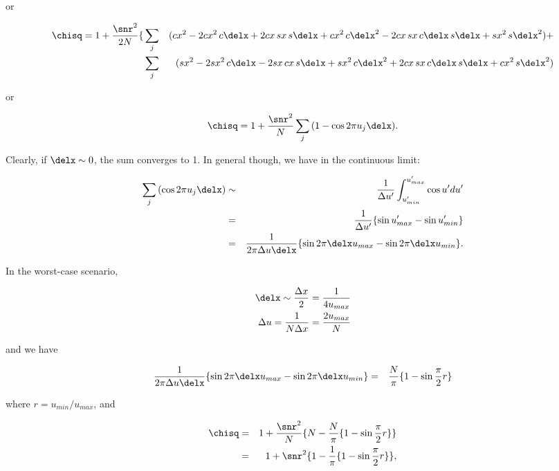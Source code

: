 or 

\begin{eqnarray}\nonumber
  \chisq = 1 + {\snr^2\over{2N}}\{&\sum_j&{( cx^2 - 2cx^2\,c\delx + 2cx\,sx\,s\delx + cx^2\,c\delx^2 - 2cx\,sx\,c\delx\,s\delx  + sx^2\,s\delx^2}) + \\\nonumber
                                  &\sum_j&{(sx^2 - 2sx^2\,c\delx - 2sx\,cx\,s\delx + sx^2\,c\delx^2 + 2cx\,sx\,c\delx\,s\delx + cx^2\,s\delx^2)}
\end{eqnarray}

or 

\begin{equation}
  \chisq = 1 + {\snr^2\over{N}}\sum_j{(1 - \cos{2\pi u_j\delx})}.
\end{equation}

Clearly, if $\delx\sim 0$, the sum converges to 1.  In general though, we have in the continuous limit:

\begin{eqnarray}\nonumber
  \sum_j{(\cos{2\pi u_j\delx})} &\sim& {1\over{\Delta u^\prime}}\int^{u^\prime_{max}}_{u^\prime_{min}}{\cos{u^\prime}du^\prime} \\\nonumber
  &=& {1\over{\Delta u^\prime}}\{\sin{u^\prime_{max}} - \sin{u^\prime_{min}}\} \\\nonumber
  &=& {1\over{2\pi\Delta u\delx}}\{\sin{2\pi\delx u_{max}} - \sin{2\pi\delx u_{min}}\}.
\end{eqnarray}

In the worst-case scenario, 

\begin{eqnarray}\nonumber
\delx \sim {{\Delta x}\over{2}} = {1\over{4u_{max}}}\\\nonumber
\Delta u = {1\over{N\Delta x}} = {{2u_{max}}\over{N}}
\end{eqnarray}

and we have

\begin{eqnarray}\nonumber
  {1\over{2\pi\Delta u\delx}}\{\sin{2\pi\delx u_{max}} - \sin{2\pi\delx u_{min}}\}
  &=&  {N\over{\pi}}\{1 - \sin{{\pi\over{2}}{r}}\}
\end{eqnarray}

where $r = u_{min}/u_{max}$, and 

\begin{eqnarray}\nonumber
  \chisq &=& 1 + {\snr^2\over{N}}\{N - {N\over{\pi}}\{1 - \sin{{\pi\over{2}}{r}}\}\} \\\nonumber
         &=& 1 + \snr^2\{1 - {1\over{\pi}}\{1 - \sin{{\pi\over{2}}{r}}\}\},
\end{eqnarray}

